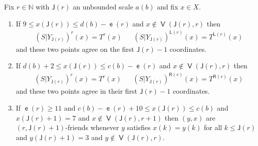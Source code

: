 \documentclass[10pt]{amsart}
\theoremstyle{definition}\newtheorem{defi}[theo]{Definition}\newtheorem{rema}[theo]{Remark}\newtheorem{exam}[theo]{Example}\newtheorem{exem}[theo]{Example}\newtheorem{nota}[theo]{Notation}
\DeclareMathOperator{\lst}{\mathsf{e}}
\DeclareMathOperator{\bad}{\mathsf{V}}
\newcommand{\N}{\mathbb{N}}
\newcommand{\lft}{\mathsf{L}}
\newcommand{\rht}{\mathsf{R}}
\newcommand{\scl}{\mathsf{J}}
\begin{document}
\begin{coro}\label{cor:pos reduc conseq}
Fix $r \in \N$ with $\scl(r)$ an unbounded scale $a(b)$ and fix $x \in X$.
\begin{enumerate}
\item\label{cor:pos red T left}
If $9 \le x(\scl(r)) \le d(b)-\lst(r)$ and $x \not\in \bad(\scl(r),r)$ then
\begin{align*}
&(S|Y_{\scl(r)})^r(x)=T^r(x)
&&(S|Y_{\scl(r)})^{\lft(r)}(x) = T^{\lft(r)}(x)
\end{align*}
and these two points agree on the first $\scl(r)-1$ coordinates.
\item\label{cor:pos red T right}
If $d(b) + 2 \le x(\scl(r)) \le c(b) - \lst(r)$ and $x \not\in \bad(\scl(r),r)$ then
\begin{align*}
&(S|Y_{\scl(r)})^r(x) = T^r(x)
&&(S|Y_{\scl(r)})^{\rht(r)}(x) = T^{\rht(r)}(x)
\end{align*}
and these two points agree in their first $\scl(r)-1$ coordinates.
\item\label{cor:pos red T friends}
If $\lst(r) \geq 11$ and $c(b) - \lst(r) + 10 \le x(\scl(r)) \le c(b)$ and $x(\scl(r)+1) = 7$ and $x \not\in \bad(\scl(r),r+1)$ then $(y,x)$ are $(r,\scl(r)+1)$-friends whenever $y$ satisfies $x(k) = y(k)$ for all $k \le \scl(r)$ and $y(\scl(r)+1) = 3$ and $y \not\in \bad(\scl(r),r)$.
\end{enumerate}
\end{coro}
\end{document}
